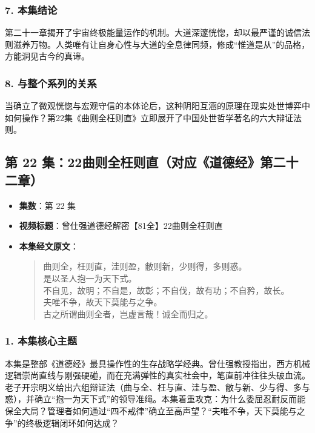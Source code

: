 \subsubsection{7. 本集结论}
第二十一章揭开了宇宙终极能量运作的机制。大道深邃恍惚，却以最严谨的诚信法则滋养万物。人类唯有让自身心性与大道的全息律同频，修成“惟道是从”的品格，方能洞见古今的真谛。

\subsubsection{8. 与整个系列的关系}
当确立了微观恍惚与宏观守信的本体论后，这种阴阳互涵的原理在现实处世博弈中如何操作？第22集《曲则全枉则直》立即展开了中国处世哲学著名的六大辩证法则。

\clearpage

\subsection{第 22 集：22曲则全枉则直（对应《道德经》第二十二章）}
\label{sec:ep22}

\begin{itemize}
    \item \textbf{集数}：第 22 集
    \item \textbf{视频标题}：曾仕强道德经解密【81全】22曲则全枉则直
    
    \item \textbf{本集经文原文}：
    \begin{quote}\kaishu
    曲则全，枉则直，洼则盈，敝则新，少则得，多则惑。\\
    是以圣人抱一为天下式。\\
    不自见，故明；不自是，故彰；不自伐，故有功；不自矜，故长。\\
    夫唯不争，故天下莫能与之争。\\
    古之所谓曲则全者，岂虚言哉！诚全而归之。
    \end{quote}
\end{itemize}

\subsubsection{1. 本集核心主题}
本集是整部《道德经》最具操作性的生存战略学经典。曾仕强教授指出，西方机械逻辑崇尚直线与刚强硬碰，而在充满弹性的真实社会中，笔直前冲往往头破血流。老子开宗明义给出六组辩证法（曲与全、枉与直、洼与盈、敝与新、少与得、多与惑），并确立“抱一为天下式”的领导准绳。本集着重攻克：为什么委屈忍耐反而能保全大局？管理者如何通过“四不戒律”确立至高声望？“夫唯不争，天下莫能与之争”的终极逻辑闭环如何达成？

